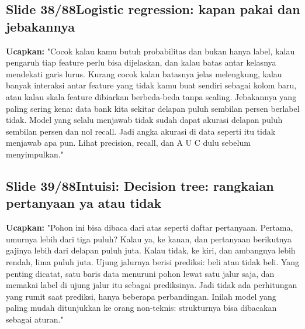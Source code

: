 \documentclass[11pt]{article}
\renewcommand{\framebox}[1]{\colorbox{acc!15}{\textcolor{acc}{\textbf{#1}}}}
\begin{document}
\subsection*{\framebox{Slide 38/88}\quad Logistic regression: kapan pakai dan jebakannya}
\textbf{Ucapkan:} "Cocok kalau kamu butuh probabilitas dan bukan hanya label, kalau pengaruh tiap feature perlu bisa dijelaskan, dan kalau batas antar kelasnya mendekati garis lurus. Kurang cocok kalau batasnya jelas melengkung, kalau banyak interaksi antar feature yang tidak kamu buat sendiri sebagai kolom baru, atau kalau skala feature dibiarkan berbeda-beda tanpa scaling. Jebakannya yang paling sering kena: data bank kita sekitar delapan puluh sembilan persen berlabel tidak. Model yang selalu menjawab tidak sudah dapat akurasi delapan puluh sembilan persen dan nol recall. Jadi angka akurasi di data seperti itu tidak menjawab apa pun. Lihat precision, recall, dan A U C dulu sebelum menyimpulkan."\\[2pt]

\subsection*{\framebox{Slide 39/88}\quad Intuisi: Decision tree: rangkaian pertanyaan ya atau tidak}
\textbf{Ucapkan:} "Pohon ini bisa dibaca dari atas seperti daftar pertanyaan. Pertama, umurnya lebih dari tiga puluh? Kalau ya, ke kanan, dan pertanyaan berikutnya gajinya lebih dari delapan puluh juta. Kalau tidak, ke kiri, dan ambangnya lebih rendah, lima puluh juta. Ujung jalurnya berisi prediksi: beli atau tidak beli. Yang penting dicatat, satu baris data menuruni pohon lewat satu jalur saja, dan memakai label di ujung jalur itu sebagai prediksinya. Jadi tidak ada perhitungan yang rumit saat prediksi, hanya beberapa perbandingan. Inilah model yang paling mudah ditunjukkan ke orang non-teknis: strukturnya bisa dibacakan sebagai aturan."\\[2pt]
\end{document}
